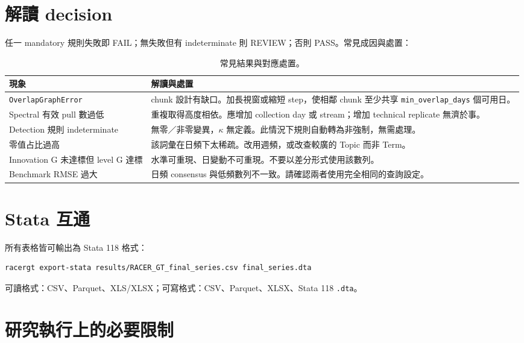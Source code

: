 \documentclass[12pt,a4paper,oneside]{article}
\begin{document}
\section{解讀 decision}

任一 mandatory 規則失敗即 FAIL；無失敗但有 indeterminate 則 REVIEW；否則 PASS。常見成因與處置：

\begin{table}[H]
\centering\small
\caption{常見結果與對應處置。}
\begin{tabularx}{\textwidth}{lX}
\toprule
現象 & 解讀與處置\\
\midrule
\texttt{OverlapGraphError} & chunk 設計有缺口。加長視窗或縮短 step，使相鄰 chunk 至少共享 \texttt{min\_overlap\_days} 個可用日。\\
Spectral 有效 pull 數過低 & 重複取得高度相依。應增加 collection day 或 stream；增加 technical replicate 無濟於事。\\
Detection 規則 indeterminate & 無零／非零變異，$\kappa$ 無定義。此情況下規則自動轉為非強制，無需處理。\\
零值占比過高 & 該詞彙在日頻下太稀疏。改用週頻，或改查較廣的 Topic 而非 Term。\\
Innovation G 未達標但 level G 達標 & 水準可重現、日變動不可重現。不要以差分形式使用該數列。\\
Benchmark RMSE 過大 & 日頻 consensus 與低頻數列不一致。請確認兩者使用完全相同的查詢設定。\\
\bottomrule
\end{tabularx}
\end{table}

\section{Stata 互通}

所有表格皆可輸出為 Stata 118 格式：

\begin{lstlisting}[language=bash]
racergt export-stata results/RACER_GT_final_series.csv final_series.dta
\end{lstlisting}

可讀格式：CSV、Parquet、XLS/XLSX；可寫格式：CSV、Parquet、XLSX、Stata 118 \texttt{.dta}。

\section{研究執行上的必要限制}
\end{document}
